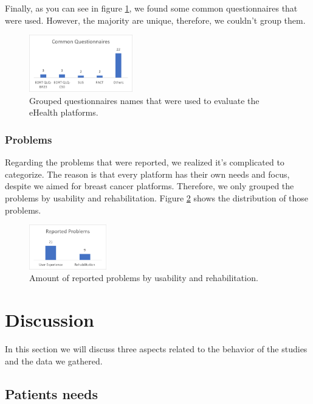 \documentclass[conference]{IEEEtran}
\begin{document}
Finally, as you can see in figure \ref{fig:common_questionnaires}, we found some common questionnaires that were used. However, the majority are unique, therefore, we couldn't group them.

\begin{figure}[h]
    \centering
    \includegraphics[width=0.40\textwidth]{charts/common_questionnaires.png}
    \caption{Grouped questionnaires names that were used to evaluate the eHealth platforms.}
    \label{fig:common_questionnaires}
\end{figure}

\subsubsection{Problems}
\label{subsubsection:problems}


Regarding the problems that were reported, we realized it's complicated to categorize. The reason is that every platform has their own needs and focus, despite we aimed for breast cancer platforms. Therefore, we only grouped the problems by usability and rehabilitation. Figure \ref{fig:reported_problems} shows the distribution of those problems.
\begin{figure}[h]
    \centering
    \includegraphics[width=0.30\textwidth]{charts/reported_problems.png}
    \caption{Amount of reported problems by usability and rehabilitation.}
    \label{fig:reported_problems}
\end{figure}


\section{Discussion}

In this section we will discuss three aspects related to the behavior of the studies and the data we gathered.

\subsection{Patients needs}
\end{document}
